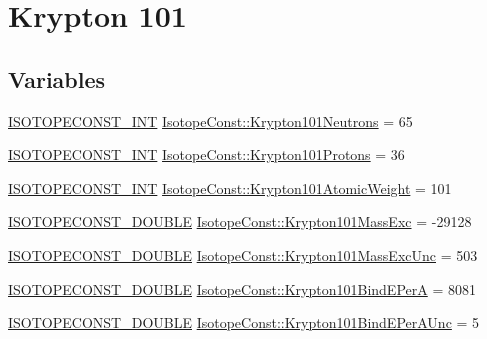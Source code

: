 \hypertarget{group___isotope_const-_krypton-_kr101}{}\section{Krypton 101}
\label{group___isotope_const-_krypton-_kr101}
\subsection*{Variables}
\begin{DoxyCompactItemize}
\item 
\mbox{\hyperlink{group___isotope_const-_macros_ga5f18360b3e99483a35c32d789e62621c}{I\+S\+O\+T\+O\+P\+E\+C\+O\+N\+S\+T\+\_\+\+I\+NT}} \mbox{\hyperlink{group___isotope_const-_krypton-_kr101_ga021c9f1fe32fe6b3465f1ce77b1ec383}{Isotope\+Const\+::\+Krypton101\+Neutrons}} = 65
\item 
\mbox{\hyperlink{group___isotope_const-_macros_ga5f18360b3e99483a35c32d789e62621c}{I\+S\+O\+T\+O\+P\+E\+C\+O\+N\+S\+T\+\_\+\+I\+NT}} \mbox{\hyperlink{group___isotope_const-_krypton-_kr101_ga6379e743f97bce840be6e49e3198c9dc}{Isotope\+Const\+::\+Krypton101\+Protons}} = 36
\item 
\mbox{\hyperlink{group___isotope_const-_macros_ga5f18360b3e99483a35c32d789e62621c}{I\+S\+O\+T\+O\+P\+E\+C\+O\+N\+S\+T\+\_\+\+I\+NT}} \mbox{\hyperlink{group___isotope_const-_krypton-_kr101_ga7256e73fbc35c3a73b7debb729351096}{Isotope\+Const\+::\+Krypton101\+Atomic\+Weight}} = 101
\item 
\mbox{\hyperlink{group___isotope_const-_macros_ga8f45a7272ce02c0b4c65c44636ed719a}{I\+S\+O\+T\+O\+P\+E\+C\+O\+N\+S\+T\+\_\+\+D\+O\+U\+B\+LE}} \mbox{\hyperlink{group___isotope_const-_krypton-_kr101_gabc951bfe36e579e3384d4cb421766303}{Isotope\+Const\+::\+Krypton101\+Mass\+Exc}} = -\/29128
\item 
\mbox{\hyperlink{group___isotope_const-_macros_ga8f45a7272ce02c0b4c65c44636ed719a}{I\+S\+O\+T\+O\+P\+E\+C\+O\+N\+S\+T\+\_\+\+D\+O\+U\+B\+LE}} \mbox{\hyperlink{group___isotope_const-_krypton-_kr101_ga89847881b754505f3a5faeaee64b793b}{Isotope\+Const\+::\+Krypton101\+Mass\+Exc\+Unc}} = 503
\item 
\mbox{\hyperlink{group___isotope_const-_macros_ga8f45a7272ce02c0b4c65c44636ed719a}{I\+S\+O\+T\+O\+P\+E\+C\+O\+N\+S\+T\+\_\+\+D\+O\+U\+B\+LE}} \mbox{\hyperlink{group___isotope_const-_krypton-_kr101_gae74c8533c7649d7c3b6975aab8885152}{Isotope\+Const\+::\+Krypton101\+Bind\+E\+PerA}} = 8081
\item 
\mbox{\hyperlink{group___isotope_const-_macros_ga8f45a7272ce02c0b4c65c44636ed719a}{I\+S\+O\+T\+O\+P\+E\+C\+O\+N\+S\+T\+\_\+\+D\+O\+U\+B\+LE}} \mbox{\hyperlink{group___isotope_const-_krypton-_kr101_ga66d61b76ce79067103fc47103073a2d6}{Isotope\+Const\+::\+Krypton101\+Bind\+E\+Per\+A\+Unc}} = 5

\end{DoxyCompactItemize}
